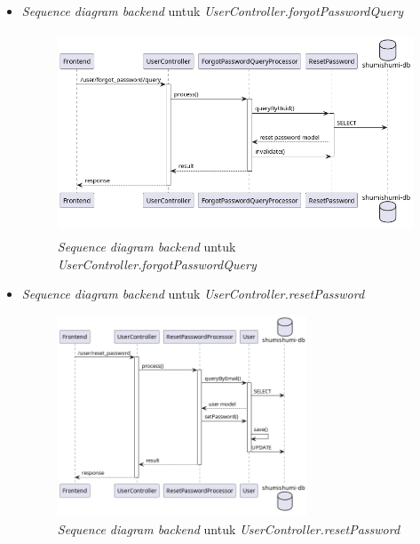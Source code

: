 \documentclass[a4paper]{article}
\begin{document}
\begin{enumerate}
\begin{enumerate}
\begin{itemize}
            \newpage
            \item \textit{Sequence diagram backend} untuk \textit{UserController.forgotPasswordQuery}
            \begin{figure}[h]
                \centering
                \includegraphics*[height=6cm]{diagram/sequence diagram/BE/user controller/forgotPasswordQuery/forgotPasswordQuery.png}
                \caption{\textit{Sequence diagram backend} untuk \textit{UserController.forgotPasswordQuery}}
            \end{figure}

            \item \textit{Sequence diagram backend} untuk \textit{UserController.resetPassword}
            \begin{figure}[h]
                \centering
                \includegraphics*[height=6cm]{diagram/sequence diagram/BE/user controller/resetPassword/resetPassword.png}
                \caption{\textit{Sequence diagram backend} untuk \textit{UserController.resetPassword}}
            \end{figure}


\end{itemize}
\end{enumerate}
\end{enumerate}
\end{document}
